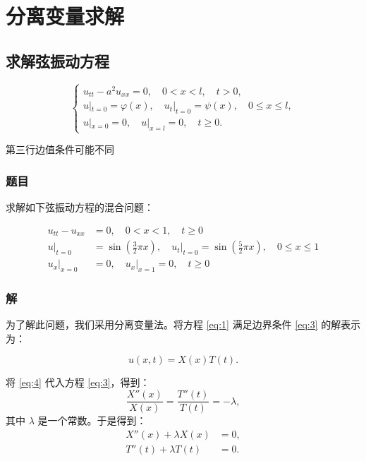 \section{分离变量求解}

\subsection{求解弦振动方程}

\[
\left\{
\begin{aligned}
u_{tt} - a^2 u_{xx} = 0, \quad 0<x<l, \quad t > 0, \\
u|_{t=0} = \varphi(x), \quad u_t|_{t=0} = \psi(x), \quad 0\leq x \leq l, \\
u|_{x=0} = 0, \quad u|_{x=l} = 0, \quad t \geq 0.
\end{aligned}
\right.
\]

第三行边值条件可能不同


\subsubsection*{题目}
求解如下弦振动方程的混合问题：

\setcounter{equation}{0}

\begin{align}
    u_{tt} - u_{xx} &= 0, \quad 0 < x < 1, \quad t \geq 0 \label{eq:1} \\
    u|_{t=0} &= \sin\left(\frac{3}{2} \pi x\right), \quad 
    u_t|_{t=0} = \sin\left(\frac{5}{2} \pi x\right), \quad 0 \leq x \leq 1 \label{eq:2} \\
    u_x|_{x=0} &= 0, \quad u_x|_{x=1} = 0, \quad t \geq 0 \label{eq:3}
\end{align}

\subsubsection*{解}

为了解此问题，我们采用分离变量法。将方程 \eqref{eq:1} 满足边界条件 \eqref{eq:3} 的解表示为：

\begin{equation}
    u(x, t) = X(x) T(t). \label{eq:4}
\end{equation}

将 \eqref{eq:4} 代入方程 \eqref{eq:3}，得到：
\begin{equation}
    \frac{X''(x)}{X(x)} = \frac{T''(t)}{T(t)} = -\lambda, \nonumber
\end{equation}
其中 $\lambda$ 是一个常数。于是得到：
\begin{align}
    X''(x) + \lambda X(x) &= 0, \label{eq:5} \\
    T''(t) + \lambda T(t) &= 0. \label{eq:6}
\end{align}

